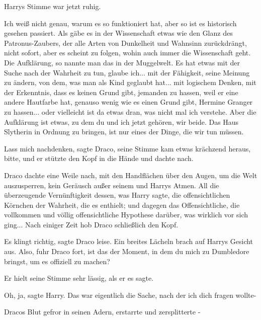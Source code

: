 Harrys Stimme war jetzt ruhig.

\glqq{}Ich weiß nicht genau, warum es so funktioniert hat, aber so ist es
historisch gesehen passiert. Als gäbe es in der Wissenschaft etwas wie den Glanz
des Patronus-Zaubers, der alle Arten von Dunkelheit und Wahnsinn zurückdrängt,
nicht sofort, aber es scheint zu folgen, wohin auch immer die Wissenschaft geht.
Die Aufklärung, so nannte man das in der Muggelwelt. Es hat etwas mit der Suche
nach der Wahrheit zu tun, glaube ich... mit der Fähigkeit, seine Meinung zu
ändern, von dem, was man als Kind geglaubt hat... mit logischem Denken, mit der
Erkenntnis, dass es keinen Grund gibt, jemanden zu hassen, weil er eine andere
Hautfarbe hat, genauso wenig wie es einen Grund gibt, Hermine Granger zu
hassen... oder vielleicht ist da etwas dran, was nicht mal ich verstehe. Aber
die Aufklärung ist etwas, zu dem du und ich jetzt gehören, wir beide. Das Haus
Slytherin in Ordnung zu bringen, ist nur eines der Dinge, die wir tun
müssen.\grqq{}

\glqq{}Lass mich nachdenken\grqq{}, sagte Draco, seine Stimme kam etwas krächzend
heraus, \glqq{}bitte\grqq{}, und er stützte den Kopf in die Hände und dachte
nach.

Draco dachte eine Weile nach, mit den Handflächen über den Augen, um die Welt
auszusperren, kein Geräusch außer seinem und Harrys Atmen. All die überzeugende
Vernünftigkeit dessen, was Harry sagte, die offensichtlichen Körnchen der
Wahrheit, die es enthielt; und dagegen das Offensichtliche, die vollkommen und
völlig offensichtliche Hypothese darüber, was wirklich vor sich ging... Nach
einiger Zeit hob Draco schließlich den Kopf.

\glqq{}Es klingt richtig\grqq{}, sagte Draco leise. Ein breites Lächeln brach auf
Harrys Gesicht aus. \glqq{}Also\grqq{}, fuhr Draco fort, \glqq{}ist das der
Moment, in dem du mich zu Dumbledore bringst, um es offiziell zu machen?\grqq{}

Er hielt seine Stimme sehr lässig, als er es sagte.

\glqq{}Oh, ja\grqq{}, sagte Harry. \glqq{}Das war eigentlich die Sache, nach der
ich dich fragen wollte-\grqq{}

Dracos Blut gefror in seinen Adern, erstarrte und zersplitterte -

